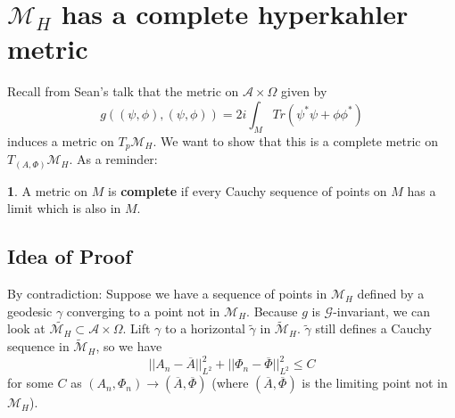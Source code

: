\documentclass[oneside,english]{amsbook}
\numberwithin{section}{chapter}
\numberwithin{equation}{section}
\numberwithin{figure}{section}
\theoremstyle{plain}
\theoremstyle{definition}
\theoremstyle{remark}
\theoremstyle{definition}
\theoremstyle{definition}
\newtheorem*{defn*}{\protect\definitionname}
\theoremstyle{plain}
\providecommand{\definitionname}{Definition}
\begin{document}
\section{$\mathcal{M}_{H}$ has a complete hyperkahler metric}

Recall from Sean's talk that the metric on $\mathcal{A}\times\Omega$
given by 
\[
g\left((\psi,\phi),\left(\psi,\phi\right)\right)=2i\int_{M}Tr\left(\psi^{*}\psi+\phi\phi^{*}\right)
\]
induces a metric on $T_{p}\mathcal{M}_{H}$. We want to show that
this is a complete metric on $T_{\left(A,\Phi\right)}\mathcal{M}_{H}$.
As a reminder:
\begin{defn*}
A metric on $M$ is \textbf{complete} if every Cauchy sequence of
points on $M$ has a limit which is also in $M$.
\end{defn*}

\subsection{Idea of Proof}

By contradiction: Suppose we have a sequence of points in $\mathcal{M}_{H}$
defined by a geodesic $\gamma$ converging to a point not in $\mathcal{M}_{H}$.
Because $g$ is $\mathcal{G}$-invariant, we can look at $\tilde{\mathcal{M}_{H}}\subset\mathcal{A}\times\Omega$.
Lift $\gamma$ to a horizontal $\tilde{\gamma}$ in $\tilde{\mathcal{M}}_{H}$.
$\tilde{\gamma}$ still defines a Cauchy sequence in $\tilde{\mathcal{M}}_{H}$,
so we have 
\[
||A_{n}-\overline{A}||_{L^{2}}^{2}+||\Phi_{n}-\overline{\Phi}||_{L^{2}}^{2}\leq C
\]
 for some $C$ as $\left(A_{n},\Phi_{n}\right)\rightarrow\left(\overline{A},\overline{\Phi}\right)$
(where $\left(\overline{A},\overline{\Phi}\right)$ is the limiting
point not in $\mathcal{M}_{H}$). 
\end{document}
